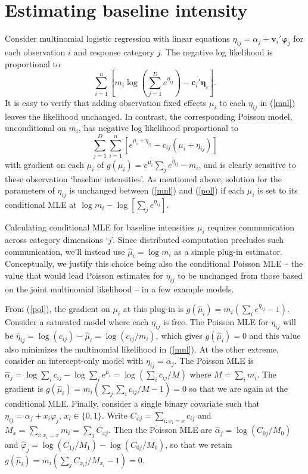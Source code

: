\documentclass[12pt]{article}
\newcommand{\bs}[1]{\boldsymbol{#1}}
\newcommand{\bm}[1]{\mathbf{#1}}
\begin{document}
\section{Estimating baseline intensity}
\label{MU}

Consider multinomial logistic regression with linear equations $\eta_{ij} =
\alpha_{j} + \bm{v}_i'\bs{\varphi}_j$ for each observation $i$ and response
category $j$.  The negative log likelihood is proportional to 
\begin{equation}
\label{mnl} \sum_{i=1}^n\left[ m_i\log\left(\sum_{j=1}^D e^{\eta_{ij}}\right)
- \bm{c}_{i}'\bs{\eta}_{i} \right]. 
\end{equation} 
It is easy to verify that adding observation fixed effects $\mu_i$ to each
$\eta_{ij}$ in (\ref{mnl}) leaves the likelihood unchanged.  In contrast, the
corresponding Poisson model, unconditional on $m_i$, has negative log
likelihood proportional to 
\begin{equation} \label{pol}
\sum_{j=1}^D\sum_{i=1}^n\left[ e^{\mu_i + \eta_{ij}} - c_{ij}(\mu_i +
\eta_{ij}) \right] 
\end{equation} 
with gradient on each $\mu_i$ of $g(\mu_i) =
e^{\mu_i}\sum_j e^{\eta_{ij}} - m_i$, and  is clearly sensitive to these
observation `baseline intensities'.  As mentioned above, solution for the
parameters of $\eta_{ij}$ is unchanged between (\ref{mnl}) and (\ref{pol}) if
each $\mu_i$ is set to its conditional MLE at $\log m_i - \log \left[\sum_j
e^{\eta_{ij}}\right]$.

Calculating conditional MLE for baseline intensities $\mu_i$ requires
communication across category dimensions `$j$'. Since distributed computation
precludes such communication, we'll instead use  $\hat \mu_i = \log m_i$ as a
simple plug-in estimator. Conceptually, we justify this choice being also the
conditional Poisson MLE -- the value that would lead  Poisson estimates for
$\eta_{ij}$ to be unchanged from those based on the  joint multinomial
likelihood  -- in a few example models.

From (\ref{pol}), the gradient on $\mu_i$ at this plug-in is $g(\hat \mu_i) =
m_i \left(\sum_i e^{\eta_{ij}}-1\right)$.  Consider a saturated model where
each $\eta_{ij}$ is free.  The Poisson MLE for $\eta_{ij}$ will be $\hat
\eta_{ij} = \log(c_{ij}) - \hat \mu_i = \log(c_{ij}/m_i)$, which gives $g(\hat
\mu_i) = 0$ and this value also minimizes the multinomial likelihood in (\ref{mnl}).   At
the other extreme, consider an intercept-only model with $\eta_{ij} =
\alpha_j$.  The Poisson MLE is $\hat\alpha_j = \log \sum_i c_{ij} - \log
\sum_i e^{\hat\mu_i} = \log\left( \sum_i c_{ij}/M \right)$ where $M = \sum_i
m_i$.  The gradient is $g(\hat \mu_i) = m_i(\sum_j \sum_i c_{ij}/M -1) =
0$ so that we are again at the conditional MLE. Finally, consider a single
binary covariate such that $\eta_{ij} = \alpha_j + x_i \varphi_j$, $x_i \in
\{0,1\}$.  Write $C_{xj} = \sum_{i: x_i=x} c_{ij}$ and  $M_{x} = \sum_{i:
x_i=x} m_i = \sum_j C_{xj}$.  Then the Poisson MLE are $\hat\alpha_j =
\log(C_{0j}/M_0)$ and $\hat\varphi_j = \log(C_{1j}/M_1) - \log(C_{0j}/M_0)$,
so that we retain $g(\hat \mu_i) = m_i\left(\sum_j C_{x_ij}/M_{x_i} -1 \right)
=0$.
\end{document}
